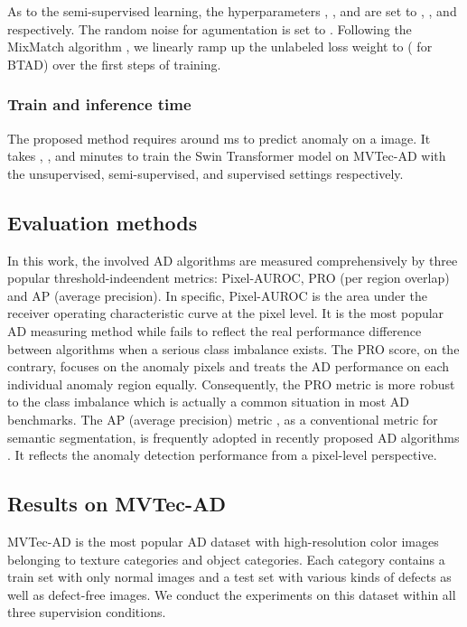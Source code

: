 As to the semi-supervised learning, the hyperparameters , ,  and 
are set to , ,  and  respectively. The random noise for agumentation
is set to .
Following the MixMatch algorithm \citep{berthelot2019mixmatch}, we linearly ramp up the
unlabeled loss weight to  ( for BTAD) over the first  steps
of training. 

\subsubsection{Train and inference time} 
The proposed method requires around  ms to predict anomaly on a  image.
It takes , , and  minutes to train the Swin Transformer model on MVTec-AD
\citep{bergmann2019mvtec} with the unsupervised, semi-supervised, and supervised settings
respectively.

\subsection{Evaluation methods}
\label{subsec:Datasets_and_evaluation_methods}

In this work, the involved AD algorithms are measured comprehensively by three popular threshold-inde\-endent metrics: Pixel-AUROC, PRO \citep{bergmann2020uninformed} (per region overlap) and AP \citep{zavrtanik2021draem} (average precision). In specific, Pixel-AUROC is the area under the receiver operating characteristic curve at the pixel
level. It is the most popular AD measuring method while fails to reflect the real performance difference between algorithms when a serious class imbalance exists. The PRO score, on the contrary, focuses on the anomaly pixels and treats the AD performance on each individual anomaly region equally. Consequently, the PRO metric is more robust to the class imbalance which is actually a common situation in most AD benchmarks. The AP (average precision) metric \citep{zavrtanik2021draem}, as a conventional metric for semantic segmentation, is frequently adopted in recently proposed AD algorithms \citep{zavrtanik2021draem, zhang2022prototypical}. It reflects the anomaly detection performance from a pixel-level perspective. 



\subsection{Results on MVTec-AD}
\label{subsec:Results_on_MVTec_AD}

MVTec-AD \citep{bergmann2019mvtec} is the most popular AD dataset with 
high-resolution color images belonging to  texture categories and  object categories.
Each category contains a train set with only normal images and a test set with various kinds of
defects as well as defect-free images. We conduct the experiments on this dataset within all three supervision conditions.

